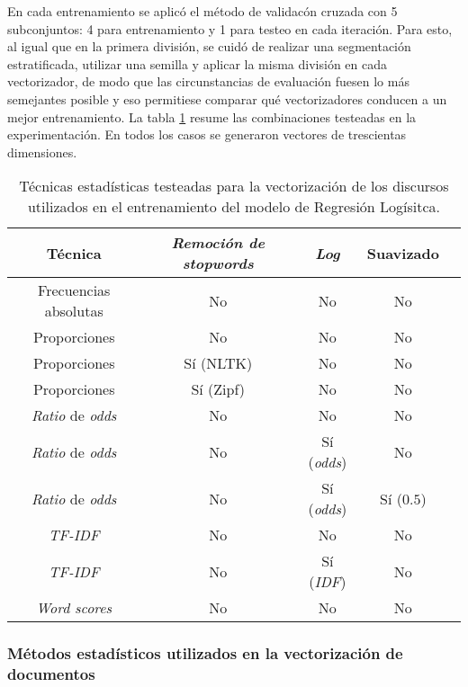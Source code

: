 En cada entrenamiento se aplic\'o el m\'etodo
de validac\'on cruzada con 5 subconjuntos: 4 para entrenamiento y 1 para testeo
en cada iteraci\'on.
Para esto, al igual que en la primera divisi\'on, se cuid\'o de realizar
una segmentaci\'on estratificada, utilizar una semilla y
aplicar la misma divisi\'on en cada vectorizador,
de modo que las circunstancias de evaluaci\'on fuesen lo m\'as semejantes posible
y eso permitiese comparar qu\'e vectorizadores conducen a un mejor entrenamiento.
La tabla \ref{table-methods-vectorizers} resume las combinaciones testeadas
en la experimentaci\'on. En todos los casos se generaron vectores de trescientas
dimensiones.

\begin{table}[ht]
\centering
\begin{tabular}{ |c|c|c|c|c| }
    \hline
    T\'ecnica & \textit{Remoci\'on de stopwords} & \textit{Log} & Suavizado \\
    \hline\hline
    Frecuencias absolutas & No & No & No \\
    \hline
    Proporciones & No & No & No \\
    \hline
    Proporciones & S\'i (NLTK) & No & No \\
    \hline
    Proporciones & S\'i (Zipf) & No & No \\
    \hline
    \textit{Ratio} de \textit{odds} & No & No & No \\
    \hline
    \textit{Ratio} de \textit{odds} & No & S\'i (\textit{odds}) & No \\
    \hline
    \textit{Ratio} de \textit{odds} & No & S\'i (\textit{odds}) & S\'i ($0.5$) \\
    \hline
    \textit{TF-IDF} & No & No & No \\
    \hline
    \textit{TF-IDF} & No & S\'i (\textit{IDF}) & No \\
    \hline
    \textit{Word scores} & No & No & No \\
    \hline
\end{tabular}
\caption{T\'ecnicas estad\'isticas testeadas para la vectorizaci\'on de los
discursos utilizados en el entrenamiento del modelo de Regresi\'on Log\'isitca.}
\label{table-methods-vectorizers}
\end{table}

\subsubsection{M\'etodos estad\'isticos utilizados en la vectorizaci\'on de documentos}
\label{subsubsec-methods-vectorizers}

